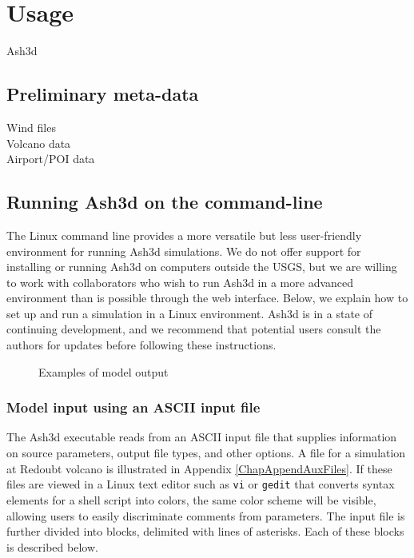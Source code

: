 \chapter{Usage}\label{ChapUsage}
Ash3d 


\section{Preliminary meta-data}\label{ChapUsageSecPrelimData}
Wind files\\
Volcano data\\
Airport/POI data

\section{Running Ash3d on the command-line}\label{ChapUsageSecCommandLine}
The Linux command line provides a more versatile but less
user-friendly environment for running Ash3d simulations.
We do not offer support for installing or running Ash3d
on computers outside the USGS, but we are willing to work
with collaborators who wish to run Ash3d in a more advanced
environment than is possible through the web interface.
Below, we explain how to set up and run a simulation in a
Linux environment. Ash3d is in a state of continuing
development, and we recommend that potential users consult
the authors for updates before following these instructions.

\begin{figure}[htbp]
\parbox{15cm}{\caption{\label{FigAsh3dOutput}
Examples of model output}}
\end{figure}

\subsection{Model input using an ASCII input file}
The Ash3d executable reads from an ASCII input file that
supplies information on source parameters, output file types,
and other options. A file for a simulation at Redoubt volcano
is illustrated in Appendix \ref{ChapAppendAuxFiles}.
If these
files are viewed in a Linux text editor such as \texttt{vi} or
\texttt{gedit}
that converts syntax elements for a shell script into colors,
the same color scheme will be visible, allowing users to easily
discriminate comments from parameters. The input file is further
divided into blocks, delimited with lines of asterisks. Each of
these blocks is described below.

